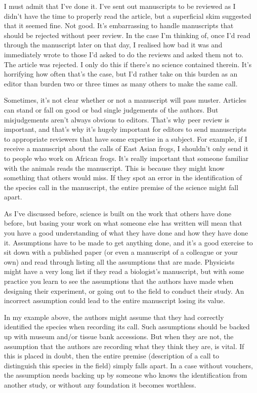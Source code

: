 \documentclass[
]{krantz}
\begin{document}
I must admit that I've done it. I've sent out manuscripts to be reviewed as I didn't have the time to properly read the article, but a superficial skim suggested that it seemed fine. Not good. It's embarrassing to handle manuscripts that should be rejected without peer review. In the case I'm thinking of, once I'd read through the manuscript later on that day, I realised how bad it was and immediately wrote to those I'd asked to do the reviews and asked them not to. The article was rejected. I only do this if there's no science contained therein. It's horrifying how often that's the case, but I'd rather take on this burden as an editor than burden two or three times as many others to make the same call.

Sometimes, it's not clear whether or not a manuscript will pass muster. Articles can stand or fall on good or bad single judgements of the authors. But misjudgements aren't always obvious to editors. That's why peer review is important, and that's why it's hugely important for editors to send manuscripts to appropriate reviewers that have some expertise in a subject. For example, if I receive a manuscript about the calls of East Asian frogs, I shouldn't only send it to people who work on African frogs. It's really important that someone familiar with the animals reads the manuscript. This is because they might know something that others would miss. If they spot an error in the identification of the species call in the manuscript, the entire premise of the science might fall apart.

As I've discussed before, science is built on the work that others have done before, but basing your work on what someone else has written will mean that you have a good understanding of what they have done and how they have done it. Assumptions have to be made to get anything done, and it's a good exercise to sit down with a published paper (or even a manuscript of a colleague or your own) and read through listing all the assumptions that are made. Physicists might have a very long list if they read a biologist's manuscript, but with some practice you learn to see the assumptions that the authors have made when designing their experiment, or going out to the field to conduct their study. An incorrect assumption could lead to the entire manuscript losing its value.

In my example above, the authors might assume that they had correctly identified the species when recording its call. Such assumptions should be backed up with museum and/or tissue bank accessions. But when they are not, the assumption that the authors are recording what they think they are, is vital. If this is placed in doubt, then the entire premise (description of a call to distinguish this species in the field) simply falls apart. In a case without vouchers, the assumption needs backing up by someone who knows the identification from another study, or without any foundation it becomes worthless.
\end{document}
